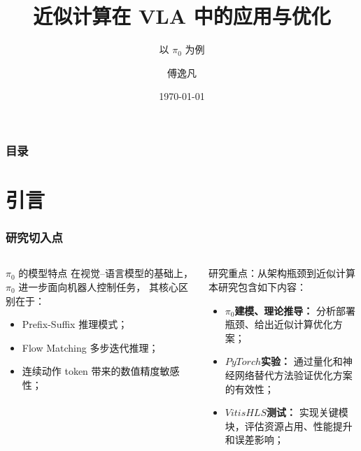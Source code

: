 \documentclass[10pt, aspectratio=169]{beamer}
\title{近似计算在 VLA 中的应用与优化}
\subtitle{以 \texorpdfstring{$\pi_0$}{pi0} 为例}
\date{\today}
\author{傅逸凡}
\institute{电气工程学院, 西南交通大学}
\begin{document}
\maketitle

\begin{frame}
  \frametitle{目录}
  \tableofcontents[hideallsubsections]
\end{frame}

\section{引言}

\begin{frame}
  \frametitle{研究切入点}
  \begin{columns}[T,onlytextwidth]
    \begin{block}{$\pi_0$ 的模型特点}
      \small
      在视觉--语言模型的基础上，$\pi_0$ 进一步面向机器人控制任务，
      其核心区别在于：
      \begin{itemize}
        \item Prefix-Suffix 推理模式；
        \item Flow Matching 多步迭代推理；
        \item 连续动作 token 带来的数值精度敏感性；
      \end{itemize}
    \end{block}
    \begin{alertblock}{研究重点：从架构瓶颈到近似计算}
      \small
      本研究包含如下内容：
      \begin{itemize}
        \item \textbf{$\pi_0$建模、理论推导：} 分析部署瓶颈、给出近似计算优化方案；
        \item \textbf{$PyTorch$实验：} 通过量化和神经网络替代方法验证优化方案的有效性；
        \item \textbf{$Vitis HLS$测试：} 实现关键模块，评估资源占用、性能提升和误差影响；

\end{itemize}
\end{alertblock}
\end{columns}
\end{frame}
\end{document}
